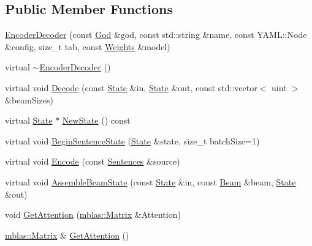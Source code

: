 \subsection*{Public Member Functions}
\begin{DoxyCompactItemize}
\item 
\hyperlink{classamunmt_1_1GPU_1_1EncoderDecoder_a651723011354bc2f6cd3b97ffffdf799}{Encoder\+Decoder} (const \hyperlink{classamunmt_1_1God}{God} \&god, const std\+::string \&name, const Y\+A\+M\+L\+::\+Node \&config, size\+\_\+t tab, const \hyperlink{structamunmt_1_1GPU_1_1Weights}{Weights} \&model)
\item 
virtual \hyperlink{classamunmt_1_1GPU_1_1EncoderDecoder_a8445580b7f4368c725576a85294d156a}{$\sim$\+Encoder\+Decoder} ()
\item 
virtual void \hyperlink{classamunmt_1_1GPU_1_1EncoderDecoder_a38b3304df3924adce09572d1bfeaeeb9}{Decode} (const \hyperlink{classamunmt_1_1State}{State} \&in, \hyperlink{classamunmt_1_1State}{State} \&out, const std\+::vector$<$ uint $>$ \&beam\+Sizes)
\item 
virtual \hyperlink{classamunmt_1_1State}{State} $\ast$ \hyperlink{classamunmt_1_1GPU_1_1EncoderDecoder_ad9db448ea4d611f9ebe01c3c6940f0d5}{New\+State} () const 
\item 
virtual void \hyperlink{classamunmt_1_1GPU_1_1EncoderDecoder_a126f5eab05e71a8b379ddd7eb8f0c75d}{Begin\+Sentence\+State} (\hyperlink{classamunmt_1_1State}{State} \&state, size\+\_\+t batch\+Size=1)
\item 
virtual void \hyperlink{classamunmt_1_1GPU_1_1EncoderDecoder_ab58288661c243eefa5d7659e5d67bf14}{Encode} (const \hyperlink{classamunmt_1_1Sentences}{Sentences} \&source)
\item 
virtual void \hyperlink{classamunmt_1_1GPU_1_1EncoderDecoder_a68e25bd3b886b3cbf4331358668dde80}{Assemble\+Beam\+State} (const \hyperlink{classamunmt_1_1State}{State} \&in, const \hyperlink{namespaceamunmt_a534a3a9a1d99c01a5adf05e700a26012}{Beam} \&beam, \hyperlink{classamunmt_1_1State}{State} \&out)
\item 
void \hyperlink{classamunmt_1_1GPU_1_1EncoderDecoder_a131827ae9f2a8512beb981f97ec3f565}{Get\+Attention} (\hyperlink{namespaceamunmt_1_1GPU_1_1mblas_ab67821a8254de53e45a623cf73c0aef6}{mblas\+::\+Matrix} \&Attention)
\item 
\hyperlink{namespaceamunmt_1_1GPU_1_1mblas_ab67821a8254de53e45a623cf73c0aef6}{mblas\+::\+Matrix} \& \hyperlink{classamunmt_1_1GPU_1_1EncoderDecoder_a7aceb128a918b03ff2117b377289dd55}{Get\+Attention} ()

\end{DoxyCompactItemize}
